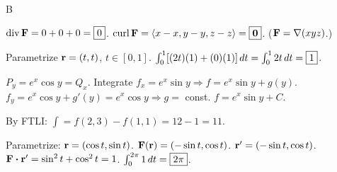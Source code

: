 \documentclass[11pt]{article}
\begin{document}
\begin{answers}{B}
\item $\operatorname{div} \mathbf{F} = 0 + 0 + 0 = \boxed{0}$. $\operatorname{curl} \mathbf{F} = \langle x - x, y - y, z - z\rangle = \boxed{\mathbf{0}}$. ($\mathbf{F} = \nabla(xyz)$.)
\item Parametrize $\mathbf{r} = (t, t)$, $t \in [0,1]$. $\int_0^1 [(2t)(1) + (0)(1)] \,dt = \int_0^1 2t \,dt = \boxed{1}$.
\item $P_y = e^x \cos y = Q_x$. \checkmark Integrate $f_x = e^x \sin y \Rightarrow f = e^x \sin y + g(y)$. $f_y = e^x \cos y + g'(y) = e^x \cos y \Rightarrow g = $ const. $\boxed{f = e^x \sin y + C}$.
\item By FTLI: $\int = f(2,3) - f(1,1) = 12 - 1 = \boxed{11}$.
\item Parametrize: $\mathbf{r} = (\cos t, \sin t)$. $\mathbf{F}(\mathbf{r}) = (-\sin t, \cos t)$. $\mathbf{r}' = (-\sin t, \cos t)$. $\mathbf{F} \boldsymbol\cdot \mathbf{r}' = \sin^2 t + \cos^2 t = 1$. $\int_0^{2\pi} 1 \,dt = \boxed{2\pi}$.
\end{answers}
\end{document}
